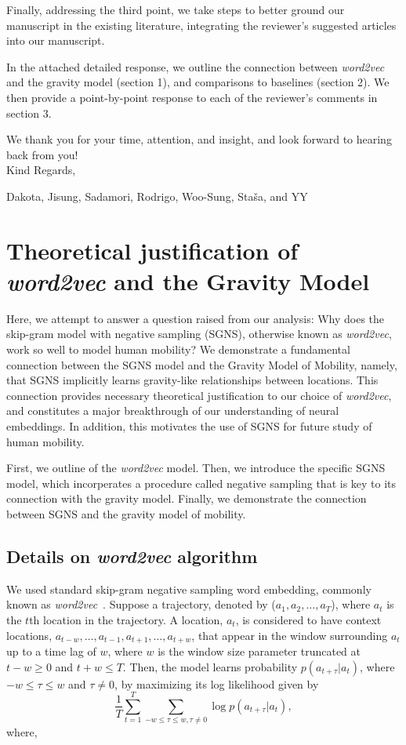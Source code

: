 \documentclass[12pt,a4paper]{article}
\begin{document}
Finally, addressing the third point, we take steps to better ground our manuscript in the existing literature, integrating the reviewer's suggested articles into our manuscript.

In the attached detailed response, we outline the connection between \textit{word2vec} and the gravity model (section 1), and comparisons to baselines (section 2). We then provide a point-by-point response to each of the reviewer's comments in section 3. 

We thank you for your time, attention, and insight, and look forward to hearing back from you!\\

Kind Regards,

Dakota, Jisung, Sadamori, Rodrigo, Woo-Sung, Staša, and YY


\clearpage
\tableofcontents
\listoffigures
\clearpage


\section{Theoretical justification of \textit{word2vec} and the Gravity Model} 
Here, we attempt to answer a question raised from our analysis: Why does the skip-gram model with negative sampling (SGNS), otherwise known as \textit{word2vec}, work so well to model human mobility?
We demonstrate a fundamental connection between the SGNS model and the Gravity Model of Mobility, namely, that SGNS implicitly learns gravity-like relationships between locations. 
This connection provides necessary theoretical justification to our choice of \textit{word2vec}, and constitutes a major breakthrough of our understanding of neural embeddings. 
In addition, this motivates the use of SGNS for future study of human mobility. 

First, we outline of the \textit{word2vec} model. 
Then, we introduce the specific SGNS model, which incorperates a procedure called negative sampling that is key to its connection with the gravity model. 
Finally, we demonstrate the connection between SGNS and the gravity model of mobility. 

\subsection{Details on \textit{word2vec} algorithm}
We used standard skip-gram negative sampling word embedding, commonly known as \textit{word2vec}~\autocite{mikolov2013word2vec}.
Suppose a trajectory, denoted by ($a_{1}, a_{2}, \ldots, a_{T}$), where $a_{t}$ is the $t$th location in the trajectory. A location, $a_{t}$, is considered to have context locations, $a_{t-w}, \ldots, a_{t-1}, a_{t+1},\ldots, a_{t+w}$, that appear in the window surrounding $a_t$ up to a time lag of $w$, where $w$ is the window size parameter truncated at $t - w \geq 0$ and $t + w \leq T$. Then, the model learns probability $p(a_{t + \tau} \vert a_{t})$, where $-w\leq \tau\leq w$ and $\tau \neq 0$,  by maximizing its log likelihood given by
%
%
\begin{equation}
	\frac{1}{T}\sum_{t = 1}^{T} \sum_{-w \leq \tau \leq w, \tau \neq 0} \log p(a_{t + \tau} \vert a_{t}),
\end{equation}
where,
\end{document}
